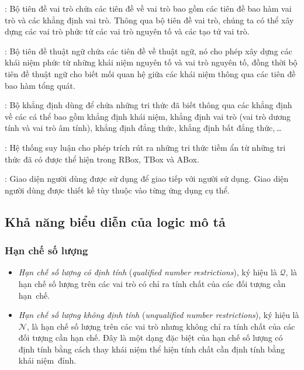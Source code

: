 : Bộ tiên đề vai trò chứa các tiên đề về vai trò bao gồm các tiên đề bao hàm vai trò và các khẳng định vai trò. Thông qua bộ tiên đề vai trò, chúng ta có thể xây dựng các vai trò phức từ các vai trò nguyên tố và các tạo tử vai trò.

: Bộ tiên đề thuật ngữ chứa các tiên đề về thuật ngữ, nó cho phép xây dựng các khái niệm phức từ những khái niệm nguyên tố và vai trò nguyên tố, đồng thời bộ tiên đề thuật ngữ cho biết mối quan hệ giữa các khái niệm thông qua các tiên đề bao hàm tổng quát.

: Bộ khẳng định dùng để chứa những tri thức đã biết thông qua các khẳng định về các cá thể bao gồm khẳng định khái niệm, khẳng định vai trò (vai trò dương tính và vai trò âm tính), khẳng định đẳng thức, khẳng định bất đẳng thức,\,\ldots

: Hệ thống suy luận cho phép trích rút ra những tri thức tiềm ẩn từ những tri thức đã có được thể hiện trong RBox, TBox và ABox.
	
: Giao diện người dùng được sử dụng để giao tiếp với người sử dụng. Giao diện người dùng được thiết kế tùy thuộc vào từng ứng dụng cụ thể.  

\subsection{Khả năng biểu diễn của logic mô tả}
\label{sec:Chap1.Expressiveness}
\subsubsection{Hạn chế số lượng}
\label{sec:Chap1.NumberRestrictions}
\begin{itemize}
	\item {\em Hạn chế số lượng có định tính} ({\em qualified number restrictions}), ký hiệu là $\mathcal{Q}$, là hạn chế số lượng trên các vai trò có chỉ ra tính chất của các đối tượng cần hạn~chế.
	
	\item {\em Hạn chế số lượng không định tính} ({\em unqualified number restrictions}), ký hiệu là $\mathcal{N}$, là hạn chế số lượng trên các vai trò nhưng không chỉ ra tính chất của các đối tượng cần hạn chế. Đây là một dạng đặc biệt của hạn chế số lượng có định tính bằng cách thay khái niệm thể hiện tính chất cần định tính bằng khái niệm~đỉnh.
\end{itemize}

